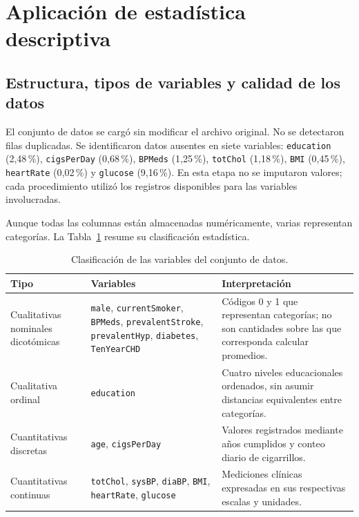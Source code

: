 \documentclass[11pt,a4paper]{article}
\begin{document}
\section{Aplicación de estadística descriptiva}

\subsection{Estructura, tipos de variables y calidad de los datos}

El conjunto de datos se cargó sin modificar el archivo original. No se detectaron filas duplicadas. Se identificaron datos ausentes en siete variables: \texttt{education} (2,48\,\%), \texttt{cigsPerDay} (0,68\,\%), \texttt{BPMeds} (1,25\,\%), \texttt{totChol} (1,18\,\%), \texttt{BMI} (0,45\,\%), \texttt{heartRate} (0,02\,\%) y \texttt{glucose} (9,16\,\%). En esta etapa no se imputaron valores; cada procedimiento utilizó los registros disponibles para las variables involucradas.

Aunque todas las columnas están almacenadas numéricamente, varias representan categorías. La Tabla~\ref{tab:tipos} resume su clasificación estadística.

\begin{table}[H]
\centering
\caption{Clasificación de las variables del conjunto de datos.}
\label{tab:tipos}
\small
\begin{tabular}{>{\raggedright\arraybackslash}p{2.8cm}>{\raggedright\arraybackslash}p{4.7cm}>{\raggedright\arraybackslash}p{6.7cm}}
\toprule
\textbf{Tipo} & \textbf{Variables} & \textbf{Interpretación} \\
\midrule
Cualitativas nominales dicotómicas & \texttt{male}, \texttt{currentSmoker}, \texttt{BPMeds}, \texttt{prevalentStroke}, \texttt{prevalentHyp}, \texttt{diabetes}, \texttt{TenYearCHD} & Códigos 0 y 1 que representan categorías; no son cantidades sobre las que corresponda calcular promedios. \\
\addlinespace
Cualitativa ordinal & \texttt{education} & Cuatro niveles educacionales ordenados, sin asumir distancias equivalentes entre categorías. \\
\addlinespace
Cuantitativas discretas & \texttt{age}, \texttt{cigsPerDay} & Valores registrados mediante años cumplidos y conteo diario de cigarrillos. \\
\addlinespace
Cuantitativas continuas & \texttt{totChol}, \texttt{sysBP}, \texttt{diaBP}, \texttt{BMI}, \texttt{heartRate}, \texttt{glucose} & Mediciones clínicas expresadas en sus respectivas escalas y unidades. \\
\bottomrule
\end{tabular}
\end{table}
\end{document}
